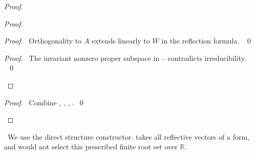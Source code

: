 \begin{proof}
\begin{proof}
\begin{proof}\pf\ Orthogonality to $A$ extends linearly to $W$ in the
reflection formula. ~\qed\end{proof}
\qedstep
\begin{proof}\pf\ The invariant nonzero proper subspace in
-- contradicts irreducibility. ~\qed\end{proof}
\end{proof}
\qedstep
\begin{proof}\pf\ Combine , ,
, .~\qed\end{proof}
\end{proof}
\noindent\new\ We use the direct structure constructor.
 takes all reflective vectors of a form,
and would not select this prescribed finite root set over $\mathbb R$.

